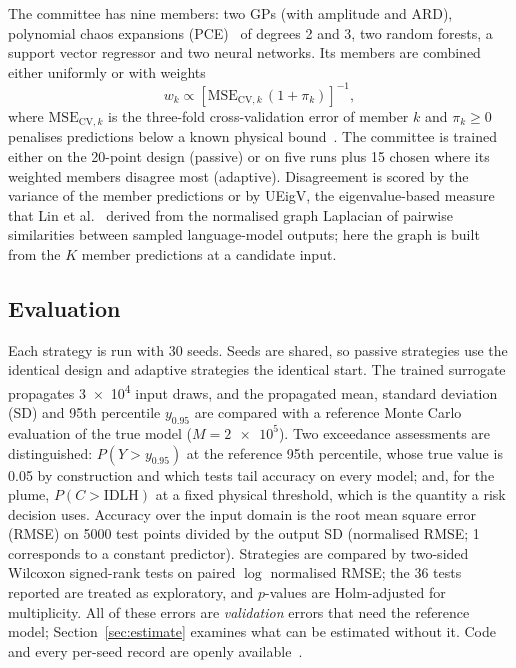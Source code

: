 \documentclass{imeko_wc}
\begin{document}
The committee has nine members: two GPs (with amplitude and ARD), polynomial
chaos expansions (PCE)~\cite{xiu2002,sudret2008} of degrees 2 and 3, two
random forests, a support vector regressor and two neural networks. Its
members are combined either uniformly or with weights
\begin{equation}
w_k\propto\left[\mathrm{MSE}_{\mathrm{CV},k}\,(1+\pi_k)\right]^{-1},
\label{eq:w}
\end{equation}
where $\mathrm{MSE}_{\mathrm{CV},k}$ is the three-fold cross-validation error
of member $k$ and $\pi_k\ge0$ penalises predictions below a known physical
bound~\cite{goel2007,viana2009}. The committee is trained either on the
20-point design (passive) or on five runs plus 15 chosen where its weighted
members disagree most (adaptive). Disagreement is scored by the variance of
the member predictions or by UEigV, the eigenvalue-based measure that Lin et
al.~\cite{lin2024} derived from the normalised graph Laplacian of pairwise
similarities between sampled language-model outputs; here the graph is built
from the $K$ member predictions at a candidate input.

\subsection{Evaluation}
Each strategy is run with 30 seeds. Seeds are shared, so passive strategies
use the identical design and adaptive strategies the identical start. The
trained surrogate propagates \num{3e4} input draws, and the propagated mean,
standard deviation (SD) and 95th percentile $y_{0.95}$ are compared with a
reference Monte Carlo evaluation of the true model ($M=\num{2e5}$). Two
exceedance assessments are distinguished: $P(Y>y_{0.95})$ at the reference
95th percentile, whose true value is 0.05 by construction and which tests
tail accuracy on every model; and, for the plume, $P(C>\mathrm{IDLH})$ at a
fixed physical threshold, which is the quantity a risk decision uses.
Accuracy over the input domain is the root mean square error (RMSE) on 5000
test points divided by the output SD (normalised RMSE; 1 corresponds to a
constant predictor). Strategies are compared by two-sided Wilcoxon
signed-rank tests on paired $\log$ normalised RMSE; the 36 tests reported are
treated as exploratory, and $p$-values are Holm-adjusted for multiplicity.
All of these errors are \emph{validation} errors that need the reference
model; Section~\ref{sec:estimate} examines what can be estimated without it.
Code and every per-seed record are openly available~\cite{repo}.
\end{document}
